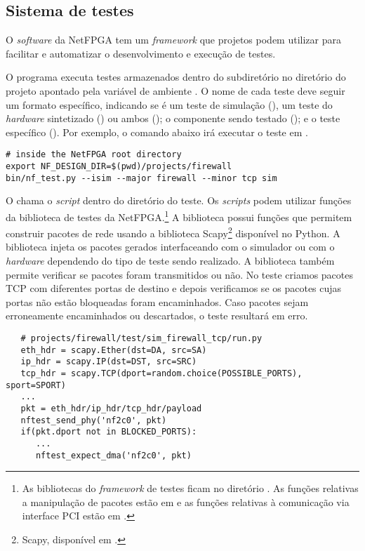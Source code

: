 \subsection{Sistema de testes}
\label{sec:impl.test}

O \emph{software} da NetFPGA tem um \emph{framework} que projetos podem
utilizar para facilitar e automatizar o desenvolvimento e execução de
testes.

O programa  executa testes armazenados dentro do
subdiretório  no diretório do projeto apontado pela variável
de ambiente . O nome de cada teste deve seguir um
formato específico, indicando se é um teste de simulação (), um
teste do \emph{hardware} sintetizado () ou ambos (); o
componente sendo testado (); e o teste específico
().  Por exemplo, o comando abaixo irá executar o teste em
.

\begin{verbatim}
# inside the NetFPGA root directory
export NF_DESIGN_DIR=$(pwd)/projects/firewall
bin/nf_test.py --isim --major firewall --minor tcp sim
\end{verbatim}

O  chama o \emph{script}  dentro do
diretório do teste.  Os \emph{scripts}  podem utilizar
funções da biblioteca de testes da NetFPGA.\footnote{As bibliotecas do
\emph{framework} de testes ficam no diretório .
As funções relativas a manipulação de pacotes estão em
 e as funções relativas à comunicação via interface
PCI estão em .} A biblioteca possui funções que
permitem construir pacotes de rede usando a biblioteca
Scapy\footnote{Scapy, disponível em
.} disponível no Python.  A
biblioteca injeta os pacotes gerados interfaceando com o simulador ou
com o \emph{hardware} dependendo do tipo de teste sendo realizado.  A
biblioteca também permite verificar se pacotes foram transmitidos ou
não.  No teste  criamos pacotes TCP com
diferentes portas de destino e depois verificamos se os pacotes cujas
portas não estão bloqueadas foram encaminhados.  Caso pacotes sejam
erroneamente encaminhados ou descartados, o teste resultará em erro.

\begin{verbatim}
   # projects/firewall/test/sim_firewall_tcp/run.py
   eth_hdr = scapy.Ether(dst=DA, src=SA)
   ip_hdr = scapy.IP(dst=DST, src=SRC)
   tcp_hdr = scapy.TCP(dport=random.choice(POSSIBLE_PORTS), sport=SPORT)
   ...
   pkt = eth_hdr/ip_hdr/tcp_hdr/payload
   nftest_send_phy('nf2c0', pkt)
   if(pkt.dport not in BLOCKED_PORTS):
      ...
      nftest_expect_dma('nf2c0', pkt)
\end{verbatim}

